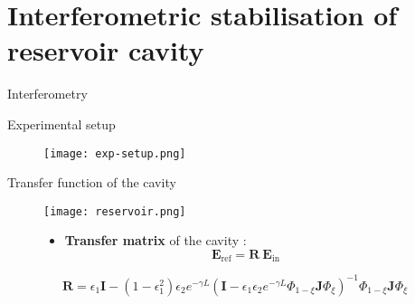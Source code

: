 \section{Interferometric stabilisation of reservoir cavity}

\begin{frame}{Interferometry}
	
\end{frame}

\begin{frame}{Experimental setup}
	\begin{figure}
		\centering
		\texttt{[image: exp-setup.png]}
	\end{figure}
\end{frame}

\begin{frame}{Transfer function of the cavity}
	\begin{figure}
		\centering
		\texttt{[image: reservoir.png]}
		\begin{itemize}
			\item \textbf{Transfer matrix} of the cavity :
			\begin{equation*}
				\mathbf{E}_{\text{ref}} = \mathbf{R} ~\mathbf{E}_{\text{in}}
			\end{equation*}
		\end{itemize}
		\begin{alertblock}{}
			\begin{equation*}
				\mathbf{R} = \epsilon_1 \mathbf{I} - (1-\epsilon_1^2) \epsilon_2 e^{-\gamma L} \left( \mathbf{I} - \epsilon_1 \epsilon_2 e^{- \gamma L} \Phi_{1-\xi} \mathbf{J} \Phi_\xi \right)^{-1} \Phi_{1-\xi} \mathbf{J} \Phi_\xi
			\end{equation*}
		\end{alertblock}

	\end{figure}
\end{frame}

